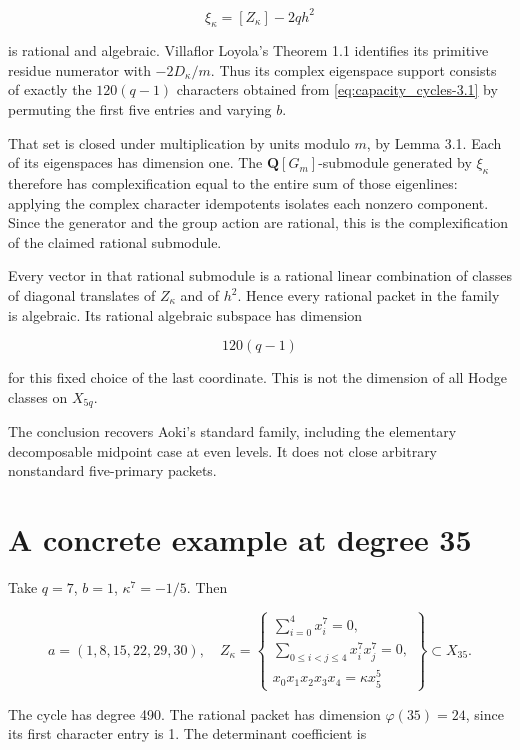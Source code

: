 \[
\xi_\kappa=[Z_\kappa]-2q h^2
\]

is rational and algebraic. Villaflor Loyola's Theorem 1.1 identifies its
primitive residue numerator with \(-2D_\kappa/m\). Thus its complex
eigenspace support consists of exactly the \(120(q-1)\) characters
obtained from \eqref{eq:capacity_cycles-3.1} by permuting the first five entries and varying
\(b\).

That set is closed under multiplication by units modulo \(m\), by Lemma
3.1. Each of its eigenspaces has dimension one. The
\(\mathbf Q[G_m]\)-submodule generated by \(\xi_\kappa\) therefore has
complexification equal to the entire sum of those eigenlines: applying
the complex character idempotents isolates each nonzero component. Since
the generator and the group action are rational, this is the
complexification of the claimed rational submodule.

Every vector in that rational submodule is a rational linear combination
of classes of diagonal translates of \(Z_\kappa\) and of \(h^2\). Hence
every rational packet in the family is algebraic. Its rational algebraic
subspace has dimension

\[
120(q-1)
\]

for this fixed choice of the last coordinate. This is not the dimension
of all Hodge classes on \(X_{5q}\).

The conclusion recovers Aoki's standard family, including the elementary
decomposable midpoint case at even levels. It does not close arbitrary
nonstandard five-primary packets.

\hypertarget{capacity_cycles-a-concrete-example-at-degree-35}{%
\section{A concrete example at degree
35}\label{capacity_cycles-a-concrete-example-at-degree-35}}

Take \(q=7\), \(b=1\), \(\kappa^7=-1/5\). Then

\[
a=(1,8,15,22,29,30),\quad
Z_\kappa=\left\{
\begin{array}{l}
\sum_{i=0}^4x_i^7=0,\\
\sum_{0\le i<j\le4}x_i^7x_j^7=0,\\
x_0x_1x_2x_3x_4=\kappa x_5^5
\end{array}\right\}\subset X_{35}.
\]

The cycle has degree 490. The rational packet has dimension
\(\varphi(35)=24\), since its first character entry is 1. The
determinant coefficient is


